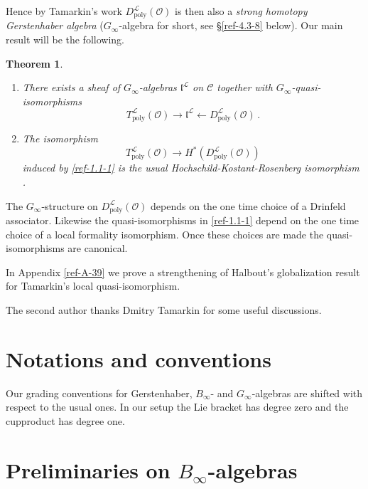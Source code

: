 \documentclass{amsart}
\numberwithin{equation}{section}
\let\cal\mathcal
\newtheorem{theorem}[lemma]{Theorem}
\theoremstyle{definition}
\theoremstyle{remark}
\begin{document}
Hence by Tamarkin's work $D_{\operatorname{poly}}^{{\cal L}}({{\cal O}})$ is
then also a \emph{strong homotopy Gerstenhaber algebra} ($G_\infty$-algebra
for short, see \S\ref{ref-4.3-8} below). Our main result will be the
following.
\begin{theorem}\label{ref-1.1-0} 
\begin{enumerate}
\item There exists a sheaf of $G_\infty$-algebras
  $\mathfrak{l}^{{\cal L}}$ on ${{\cal C}}$ together with
  $G_\infty$-quasi-isomorphisms
\begin{equation}\label{ref-1.1-1}
T_{\operatorname{poly}}^{{\cal L}}({{\cal O}})\longrightarrow\mathfrak{l}^{{\cal L}}\longleftarrow D_{\operatorname{poly}}^{{\cal L}}({{\cal O}})\,.
\end{equation}
\item The isomorphism 
\[
T_{\operatorname{poly}}^{{\cal L}}({{\cal O}})\longrightarrow H^\ast(D_{\operatorname{poly}}^{{\cal L}}({{\cal O}}))
\]
induced by \eqref{ref-1.1-1} is the usual
Hochschild-Kostant-Rosenberg isomorphism \cite{cal,ye2}. 
\end{enumerate}
\end{theorem}
The $G_\infty$-structure on  $D_{\operatorname{poly}}^{{\cal L}}({{\cal O}})$ depends on the
one time choice of a Drinfeld associator. Likewise the quasi-isomorphisms
in \eqref{ref-1.1-1} depend on the one time choice of a local formality
isomorphism. Once these choices are made the quasi-isomorphisms are canonical.

\medskip

In Appendix \ref{ref-A-39} we prove a strengthening of Halbout's globalization
result \cite[Theorem 4.5]{halb} for Tamarkin's local quasi-isomorphism. 

\medskip

The second author thanks Dmitry Tamarkin for some useful discussions. 

\section{Notations and conventions}
Our grading conventions for Gerstenhaber, $B_\infty$- and 
  $G_\infty$-algebras are shifted with respect to the usual ones. In our setup
the Lie bracket has degree zero and the cupproduct has degree one.

\section{Preliminaries on $B_\infty$-algebras}
\end{document}
